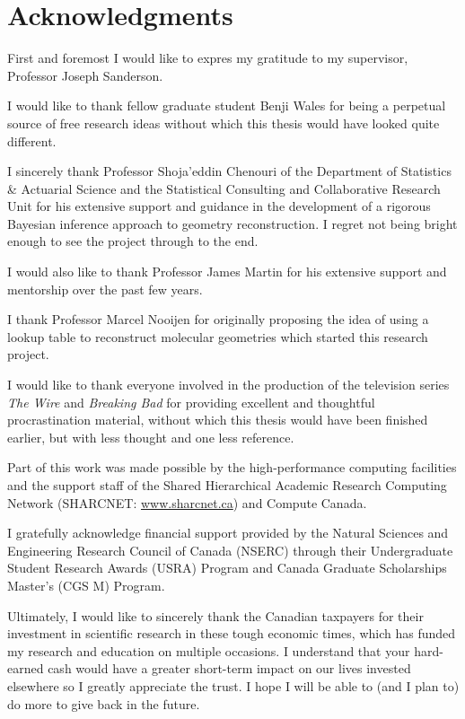 
\begingroup
\let\clearpage\relax
\let\cleardoublepage\relax
\let\cleardoublepage\relax
\chapter*{Acknowledgments}
First and foremost I would like to expres my gratitude to my supervisor, Professor Joseph Sanderson.

I would like to thank fellow graduate student Benji Wales for being a perpetual source of free research ideas without which this thesis would have looked quite different.

I sincerely thank Professor Shoja'eddin Chenouri of the Department of Statistics \& Actuarial Science and the Statistical Consulting and Collaborative Research Unit for his extensive support and guidance in the development of a rigorous Bayesian inference approach to geometry reconstruction. I regret not being bright enough to see the project through to the end.

I would also like to thank Professor James Martin for his extensive support and mentorship over the past few years.

I thank Professor Marcel Nooijen for originally proposing the idea of using a lookup table to reconstruct molecular geometries which started this research project.


I would like to thank everyone involved in the production of the television series \emph{The Wire} and \emph{Breaking Bad} for providing excellent and thoughtful procrastination material, without which this thesis would have been finished earlier, but with less thought and one less reference.

Part of this work was made possible by the high-performance computing facilities and the support staff of the Shared Hierarchical Academic Research Computing Network (SHARCNET: \href{www.sharcnet.ca}{www.sharcnet.ca}) and Compute Canada.

I gratefully acknowledge financial support provided by the Natural Sciences and Engineering Research Council of Canada (NSERC) through their Undergraduate Student Research Awards (USRA) Program and Canada Graduate Scholarships Master's (CGS M) Program.

Ultimately, I would like to sincerely thank the Canadian taxpayers for their investment in scientific research in these tough economic times, which has funded my research and education on multiple occasions. I understand that your hard-earned cash would have a greater short-term impact on our lives invested elsewhere so I greatly appreciate the trust. I hope I will be able to (and I plan to) do more to give back in the future.

\endgroup